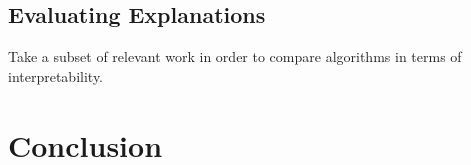 \documentclass[runningheads]{llncs}
\begin{document}
\subsection{Evaluating Explanations}
Take a subset of relevant work in order to compare algorithms in terms of interpretability.

\section{Conclusion}

%
%
%


%
\end{document}
